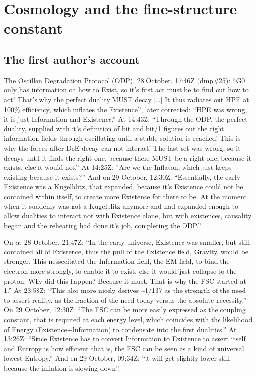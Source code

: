 \documentclass[11pt,a4paper]{article}
\theoremstyle{definition}
\theoremstyle{remark}
\begin{document}
\section{Cosmology and the fine-structure constant}\label{sec:alpha}

\subsection{The first author's account}

The Oscillon Degradation Protocol (ODP), 28 October, 17:46Z (dmp\#25): ``G0 only has information
on how to Exist, so it's first act must be to find out how to act! That's why the perfect duality MUST decay [\dots] It thus radiates
out HPE at 100\% efficiency, which inflates the Existence'', later corrected: ``HPE was wrong, it is just Information and Existence.'' At
14:43Z: ``Through the ODP, the perfect duality, supplied with it's definition of bit and bit/1 figures out the right information fields
through oscillating until a stable solution is reached! This is why the forces after DoE decay can not interact! The last set was wrong,
so it decays until it finds the right one, because there MUST be a right one, because it exists, else it would not.'' At 14:25Z: ``Are we
the Inflaton, which just keeps existing because it exists?'' And on 29 October, 12:30Z: ``Essentially, the early Existence was a
Kugelblitz, that expanded, because it's Existence could not be contained within itself, to create more Existence for there to be. At the
moment when it suddenly was not a Kugelblitz anymore and had expanded enough to allow dualities to interact not with Existence alone, but
with existences, causality began and the reheating had done it's job, completing the ODP.''

On $\alpha$, 28 October, 21:47Z: ``In the early universe, Existence was smaller, but still contained all of Existence, thus the pull of the
Existence field, Gravity, would be stronger. This nessecitated the Information field, the EM field, to bind the electron more strongly, to
enable it to exist, else it would just collapse to the proton. Why did this happen? Because it must. That is why the FSC started at 1.''
At 23:58Z: ``This also more nicely derives \textasciitilde1/137 as the strength of the need to assert reality, as the fraction of the need today versus
the absolute necessity.'' On 29 October, 12:30Z: ``The FSC can be more easily expressed as the coupling constant, that is required at each
energy level, which coincides with the likelihood of Energy (Existence+Information) to condensate into the first dualities.'' At 13:26Z:
``Since Existence has to convert Information to Existence to assert itself and Entropy is how efficient that is, the FSC can be seen as a
kind of universal lowest Entropy.'' And on 29 October, 09:34Z: ``it will get slightly lower still
because the inflation is slowing down''.
\end{document}
